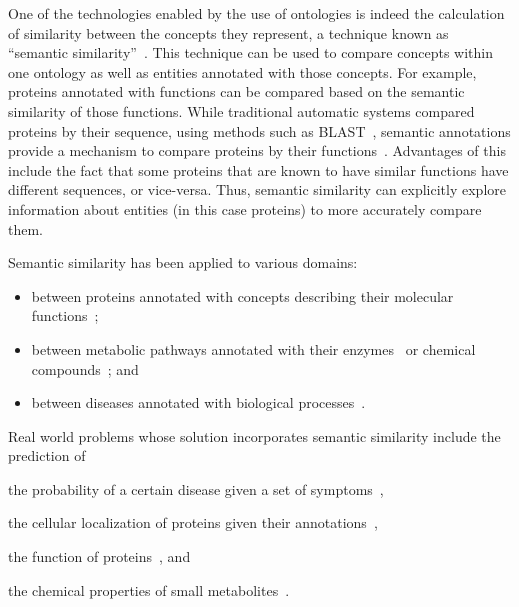 One of the technologies enabled by the use of ontologies is indeed the calculation of similarity between the concepts they represent, a technique known as ``semantic similarity''~\citep{Resnik1995,Lord2003,Pesquita2009}. This technique can be used to compare concepts within one ontology as well as entities annotated with those concepts. For example, proteins annotated with  functions can be compared based on the semantic similarity of those functions. While traditional automatic systems compared proteins by their sequence, using methods such as BLAST~\citep{Altschul1997}, semantic annotations provide a mechanism to compare proteins by their functions~\citep{Lord2003}. Advantages of this include the fact that some proteins that are known to have similar functions have different sequences, or vice-versa. Thus, semantic similarity can explicitly explore information about entities (in this case proteins) to more accurately compare them.

Semantic similarity has been applied to various domains:
\begin{itemize}
    \item between proteins annotated with  concepts describing their molecular functions~\citep{Lord2003,Lei2006};
    \item between metabolic pathways annotated with their enzymes~\citep{Clemente2005} or chemical compounds~\citep{Grego2010}; and
    \item between diseases annotated with biological processes~\citep{Schlicker2010}.
\end{itemize}
Real world problems whose solution incorporates semantic similarity include the prediction of
\begin{paralist}
    \item the probability of a certain disease given a set of symptoms~\citep{Kohler2009},
    \item the cellular localization of proteins given their annotations~\citep{Lei2006},
    \item the function of proteins~\citep{Pesquita2008}, and
    \item the chemical properties of small metabolites~\citep{Ferreira2010}.
\end{paralist}

